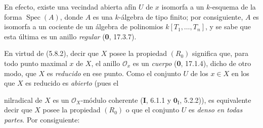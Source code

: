 En efecto, existe una vecindad abierta afín $U$ de $x$ isomorfa a un
$k$-esquema de la forma $\operatorname{Spec}(A)$, donde $A$ es una
$k$-álgebra de tipo finito; por consiguiente, $A$ es isomorfa a un cociente
de un álgebra de polinomios $k[T_1,\ldots,T_n]$, y se sabe que esta última
es un anillo \emph{regular} (\textbf 0, 17.3.7).

\begin{env}[5.8.4]
\label{IV.2.s5.8.4-fr}
En virtud de (5.8.2), decir que $X$ posee la propiedad $(R_0)$ significa que,
para todo punto maximal $x$ de $X$, el anillo $\mathcal O_x$ es un \emph{cuerpo}
(\textbf 0, 17.1.4), dicho de otro modo, que $X$ es \emph{reducido} en ese punto. Como el
conjunto $U$ de los $x\in X$ en los que $X$ es reducido es \emph{abierto} (pues el


nilradical de $X$ es un $\mathcal O_X$-módulo coherente (\textbf I, 6.1.1 y
$\mathbf{0}_{\mathrm I}$, 5.2.2)), es equivalente decir que $X$ posee la propiedad
$(R_0)$ o que el conjunto $U$ es \emph{denso en todas partes}. Por consiguiente:
\end{env}

